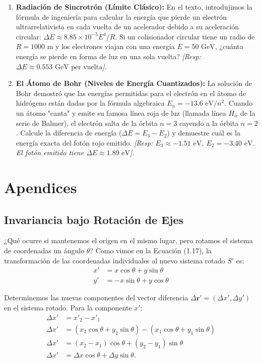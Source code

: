\documentclass[11pt,a4paper]{book}
\begin{document}
\begin{enumerate}
    \item \textbf{Radiación de Sincrotrón (Límite Clásico):} En el texto, introdujimos la fórmula de ingeniería para calcular la energía que pierde un electrón ultrarrelativista en cada vuelta de un acelerador debido a su aceleración circular: $\Delta E \approx 8.85 \times 10^{-5} E^4 / R$. Si un colisionador circular tiene un radio de $R = 1000 \text{ m}$ y los electrones viajan con una energía $E = 50 \text{ GeV}$, ¿cuánta energía se pierde en forma de luz en una sola vuelta?
    \textit{[Resp: $\Delta E \approx 0.553 \text{ GeV per vuelta}$].}

    \item \textbf{El Átomo de Bohr (Niveles de Energía Cuantizados):} La solución de Bohr demostró que las energías permitidas para el electrón en el átomo de hidrógeno están dadas por la fórmula algebraica $E_n = -13.6 \text{ eV} / n^2$. 
    Cuando un átomo "canta" y emite su famosa línea roja de luz (llamada línea $H_\alpha$ de la serie de Balmer), el electrón salta de la órbita $n=3$ cayendo a la órbita $n=2$. Calcule la diferencia de energía ($\Delta E = E_3 - E_2$) y demuestre cuál es la energía exacta del fotón rojo emitido.
    \textit{[Resp: $E_3 \approx -1.51 \text{ eV}$, $E_2 = -3.40 \text{ eV}$. El fotón emitido tiene $\Delta E \approx 1.89 \text{ eV}$].}

\end{enumerate}

\appendix


\chapter{Apendices}

\section{Invariancia bajo Rotación de Ejes}

¿Qué ocurre si mantenemos el origen en el mismo lugar, pero rotamos el sistema de coordenadas un ángulo $\theta$?
Como vimos en la Ecuación (1.17), la transformación de las coordenadas individuales al nuevo sistema rotado $S'$ es:
\begin{align}
    x' &= x \cos\theta + y \sin\theta \\
    y' &= -x \sin\theta + y \cos\theta
\end{align}

Determinemos las nuevas componentes del vector diferencia $\Delta\boldsymbol{r}' = (\Delta x', \Delta y')$ en el sistema rotado.
Para la componente $x'$:
\begin{align*}
    \Delta x' &= x'_2 - x'_1 \\
    \Delta x' &= (x_2 \cos\theta + y_2 \sin\theta) - (x_1 \cos\theta + y_1 \sin\theta) \\
    \Delta x' &= (x_2 - x_1) \cos\theta + (y_2 - y_1) \sin\theta \\
    \Delta x' &= \Delta x \cos\theta + \Delta y \sin\theta.
\end{align*}
\end{document}
